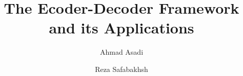 \documentclass[preprint, 12pt]{elsarticle}
\begin{document}
	\begin{frontmatter}
		
		
		\author{Ahmad Asadi}
		\author{Reza Safabakhsh}
		\address{Department of Computer Engineering and Information Technology, Amirkabir University of Technology}
		
		\title{The Ecoder-Decoder Framework and its Applications}
		
		
		\author{}
		
		\address{}
		
		\begin{abstract}
		\end{abstract}
		

\end{frontmatter}
\end{document}
